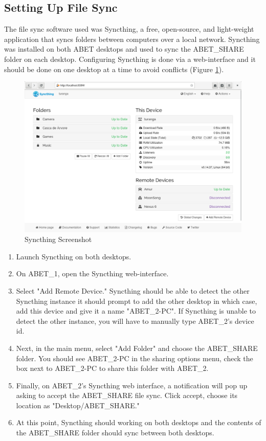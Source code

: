 \documentclass{article}
\begin{document}
\subsection{Setting Up File Sync}

The file sync software used was Syncthing, a free, open-source, and light-weight
application that syncs folders between computers over a local network. Syncthing
was installed on both ABET desktops and used to sync the ABET\_SHARE folder on
each desktop. Configuring Syncthing is done via a web-interface and it should be
done on one desktop at a time to avoid conflicts (Figure
\ref{fig:syncthing}).

\begin{figure}[H]
  \centering
  \includegraphics[scale=0.30]{./img/syncthing.png}
  \caption{Syncthing Screenshot}
  \label{fig:syncthing}
\end{figure}

\begin{enumerate}
  \item Launch Syncthing on both desktops.
  \item On ABET\_1, open the Syncthing web-interface.
  \item Select "Add Remote Device." Syncthing should be able to detect the other
    Syncthing instance it should prompt to add the other desktop in which case,
    add this device and give it a name "ABET\_2-PC". If Syncthing is unable to
    detect the other instance, you will have to manually type ABET\_2's device
    id.
  \item Next, in the main menu, select "Add Folder" and choose the ABET\_SHARE
    folder. You should see ABET\_2-PC in the sharing options menu, check the box
    next to ABET\_2-PC to share this folder with ABET\_2.
  \item Finally, on ABET\_2's Syncthing web interface, a notification will pop
    up asking to accept the ABET\_SHARE file sync. Click accept, choose its
    location as "Desktop/ABET\_SHARE."
  \item At this point, Syncthing should working on both desktops and the
    contents of the ABET\_SHARE folder should sync between both desktops.
\end{enumerate}
\end{document}
